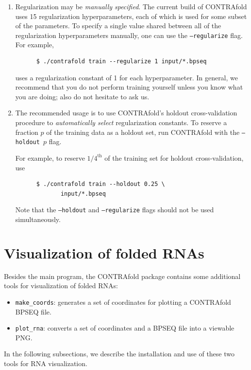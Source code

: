 \documentclass{article}
\begin{document}
  \begin{enumerate}
  \item
    Regularization may be \emph{manually specified}.  The current build of
    CONTRAfold uses 15 regularization hyperparameters, each of which is
    used for some subset of the parameters.  To specify a single value shared 
    between all of the regularization hyperparameters manually, one can use the \texttt{--regularize} flag.
    For example,
    \begin{verbatim}
      $ ./contrafold train --regularize 1 input/*.bpseq\end{verbatim}
    uses a regularization constant of 1 for each hyperparameter.  In
    general, we recommend that you do not perform training yourself
    unless you know what you are doing; also do not hesitate to ask us.
  \item
    The recommended usage is to use CONTRAfold's holdout cross-validation 
    procedure to \emph{automatically select} regularization constants.  
    To reserve a fraction $p$ of the training data as a holdout set, run
    CONTRAfold with the \texttt{--holdout $p$} flag.
    
    For example, to reserve $1/4^\text{th}$ of the training set for holdout
    cross-validation, use
    \begin{verbatim}    
      $ ./contrafold train --holdout 0.25 \
             input/*.bpseq\end{verbatim}
    Note that the \texttt{--holdout} and \texttt{--regularize} flags should
    not be used simultaneously.
  \end{enumerate}

  \newpage
  \section{Visualization of folded RNAs}

  Besides the main program, the CONTRAfold package contains some additional
  tools for visualization of folded RNAs:
  \begin{itemize}
  \item \texttt{make\_coords}: generates a set of coordinates for plotting
    a CONTRAfold BPSEQ file.
  \item \texttt{plot\_rna}: converts a set of coordinates and a BPSEQ file
    into a viewable PNG.
  \end{itemize}
  In the following subsections, we describe the installation and use of
  these two tools for RNA visualization.
\end{document}
